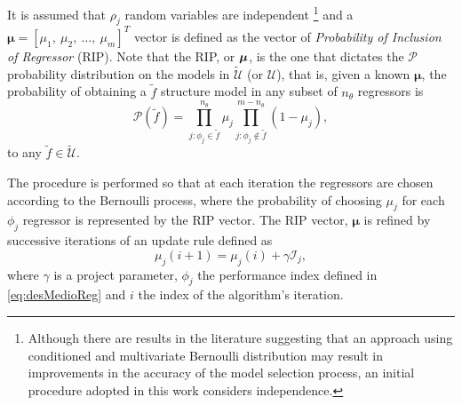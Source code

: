 It is assumed that $\rho_j$ random variables are independent \footnote{Although there are results in the literature \citep{bianchi2016} suggesting that an approach using conditioned and multivariate Bernoulli distribution may result in improvements in the accuracy of the model selection process, an initial procedure adopted in this work considers independence.} and a $\bm{\mu} = [\mu_1,\ \mu_2,\ \dots,\ \mu_m]^T$ vector is defined as the vector of \textit{Probability of Inclusion of Regressor} (RIP). Note that the RIP, or $\bm{\mu}$, is the one that dictates the $ \mathcal{P}$ probability distribution on the models in $\tilde{\mathscr{U}}$ (or $\mathscr{U}$), that is, given a known $\bm{\mu}$, the probability of obtaining a $\tilde{f}$ structure model in any subset of $n_\theta$ regressors is
\begin{equation}
   \mathcal{P}(\tilde{f}) = \prod_{j:\phi_j \in \tilde{f}}^{n_{\theta}} \mu_j \prod_{j:\phi_j \notin \tilde{f}}^{m-n_{\theta}} (1-\mu_j),
\label{eq:distProbf_til}
\end{equation}
to any $ \tilde{f} \in \tilde{\mathscr{U}}$.

The procedure is performed so that at each iteration the regressors are chosen according to the Bernoulli process, where the probability of choosing $\mu_j$ for each $\phi_j$ regressor is represented by the RIP vector. The RIP vector, $\bm{\mu}$ is refined by successive iterations of an update rule defined as
\begin{equation}
   \mu_j(i+1) = \mu_j(i) + \gamma \mathcal{I}_j,
\label{eq:RIPupdate}
\end{equation}
where $\gamma$ is a project parameter, $\phi_j$ the performance index defined in \eqref{eq:desMedioReg} and $i$ the index of the algorithm's iteration.

